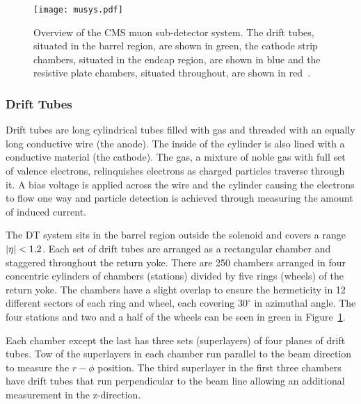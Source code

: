 \begin{figure}[!hbt]
\begin{center}
\texttt{[image: musys.pdf]}
\caption[Overview of the CMS muon subdetector system]
{\label{fig:cms_musys}
Overview of the CMS muon sub-detector system. The drift tubes, situated in the
barrel region, are shown in green, the cathode strip chambers, situated in the
endcap region, are shown in blue and the resistive plate chambers, situated
throughout, are shown in red~\cite{muontdr}.
}
\end{center}
\end{figure}

\subsubsection{Drift Tubes}
\label {sec:cms_musys_dt}

Drift tubes are long cylindrical tubes filled with gas and threaded with an
equally long conductive wire (the anode). The inside of the cylinder is also
lined with a conductive material (the cathode). The gas, a mixture of noble gas
with full set of valence electrons, relinquishes electrons as charged particles
traverse through it. A bias voltage is applied across the wire and the cylinder
causing the electrons to flow one way and particle detection is achieved through
measuring the amount of induced current.

The DT system sits in the barrel region outside the solenoid and
covers a \pr range $\left|\eta\right| < 1.2$. Each set of drift tubes are arranged as a
rectangular chamber and staggered throughout the return yoke. There are 250
chambers arranged in four concentric cylinders of chambers (stations) divided
by five rings (wheels) of the return yoke. The chambers have a slight overlap
to ensure the hermeticity in 12 different sectors of each ring and wheel, each
covering $30^{\circ}$ in azimuthal angle. The four stations and two and a half
of the wheels can be seen in green in Figure~\ref{fig:cms_musys}.

Each chamber except the last has three sets (superlayers) of four planes
of drift tubes. Tow of the superlayers in each chamber run parallel to the
beam direction to measure the $r-\phi$ position. The third superlayer in the
first three chambers have drift tubes that run perpendicular to the beam line
allowing an additional measurement in the z-direction.

